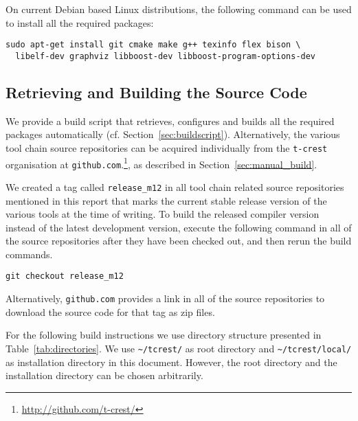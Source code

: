 On current Debian based Linux distributions, the following command can be used to install
all the required packages:

\begin{verbatim}
sudo apt-get install git cmake make g++ texinfo flex bison \
  libelf-dev graphviz libboost-dev libboost-program-options-dev
\end{verbatim}

\subsection{Retrieving and Building the Source Code}

We provide a build script that retrieves, configures and builds all
the required packages automatically (cf. Section~\ref{sec:buildscript}).
Alternatively, the various tool chain source repositories can be acquired individually from 
the \texttt{t-crest} organisation at \texttt{github.com}.\footnote{\url{http://github.com/t-crest/}}, as
described in Section~\ref{sec:manual_build}. 

We created a tag called \texttt{release\_m12} in all tool chain related source repositories mentioned in this report
that marks the current stable release version of the various tools at the time of writing.
To build the released compiler version instead of the latest development version, execute the following command
in all of the source repositories after they have been checked out, and then rerun the build commands.

\begin{verbatim}
git checkout release_m12
\end{verbatim}

Alternatively, \texttt{github.com} provides a link in all of the source repositories to download the source code for that tag as 
zip files.



For the following build instructions we use directory structure presented in Table~\ref{tab:directories}. 
We use \texttt{\textasciitilde/tcrest/} as root directory and \texttt{\textasciitilde/tcrest/local/}
as installation directory in this document. However, the root directory and the installation directory
can be chosen arbitrarily.

